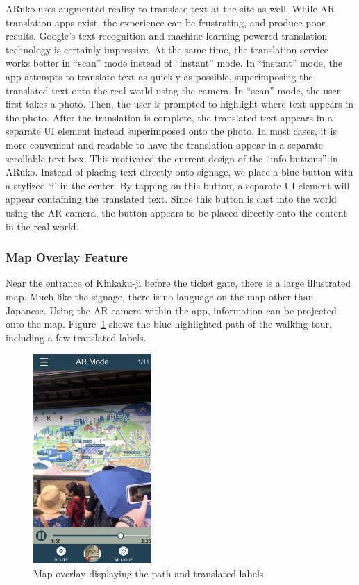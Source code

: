 \documentclass[a4paper, 10pt, american, titlepage]{article}
\begin{document}
ARuko uses augmented reality to translate text at the site as well. While AR
translation apps exist, the experience can be frustrating, and produce poor
results. Google's text recognition and machine-learning powered translation
technology is certainly impressive. At the same time, the translation service
works better in ``scan'' mode instead of ``instant'' mode. In ``instant'' mode,
the app attempts to translate text as quickly as possible, superimposing the
translated text onto the real world using the camera. In ``scan'' mode, the user
first takes a photo. Then, the user is prompted to highlight where text appears
in the photo. After the translation is complete, the translated text appears in
a separate UI element instead superimposed onto the photo. In most cases, it is
more convenient and readable to have the translation appear in a separate
scrollable text box. This motivated the current design of the ``info buttons''
in ARuko. Instead of placing text directly onto signage, we place a blue button
with a stylized `i' in the center. By tapping on this button, a separate UI
element will appear containing the translated text. Since this button is cast
into the world using the AR camera, the button appears to be placed directly
onto the content in the real world.

\subsubsection{Map Overlay Feature}
\label{sec:mapOverlayFeature}

Near the entrance of Kinkaku-ji before the ticket gate, there is a large
illustrated map. Much like the signage, there is no language on the map other
than Japanese. Using the AR camera within the app, information can be projected
onto the map. Figure~\ref{fig:arMapFeature} shows the blue highlighted path of
the walking tour, including a few translated labels.

\begin{figure}[h] \centering
    \includegraphics[width=0.4\textwidth]{ar-map-feature.png}
    \caption{Map overlay displaying the path and translated labels}
    \label{fig:arMapFeature}
\end{figure}
\end{document}
